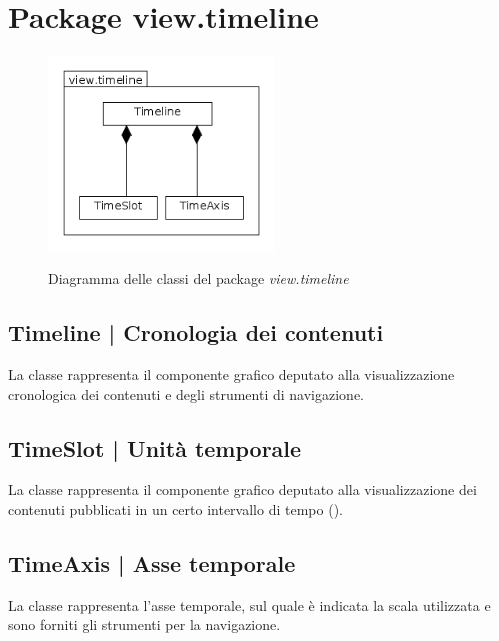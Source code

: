 \documentclass[10pt,a4paper,headinclude,footinclude,hidelinks]{scrreprt} %
\begin{document}
	\section{Package view.timeline}
	\label{sec:stage:design:view.timeline}

	\begin{figure}[ht]
		\begin{center}
	    	\includegraphics[width=6cm]{class/view_timeline.png}
			\label{gfx:class:view:timeline}
			\caption{Diagramma delle classi del package \textit{view.timeline}}
		\end{center}
	\end{figure}

	\subsection[Timeline]{Timeline | Cronologia dei contenuti}
	\label{sec:stage:design:view.timeline:timeline-view}
	La classe \textit{} rappresenta il componente grafico deputato alla visualizzazione cronologica dei contenuti e degli strumenti di navigazione.

	\subsection[TimeSlot]{TimeSlot | Unità temporale}
	\label{sec:stage:design:view.timeline:time-slot}
	La classe \textit{} rappresenta il componente grafico deputato alla visualizzazione dei contenuti pubblicati in un certo intervallo di tempo (\textit{}).

	\subsection[TimeAxis]{TimeAxis | Asse temporale}
	\label{sec:stage:design:view.timeline:time-axis}
	La classe \textit{} rappresenta l'asse temporale, sul quale è indicata la scala utilizzata e sono forniti gli strumenti per la navigazione.
\end{document}
